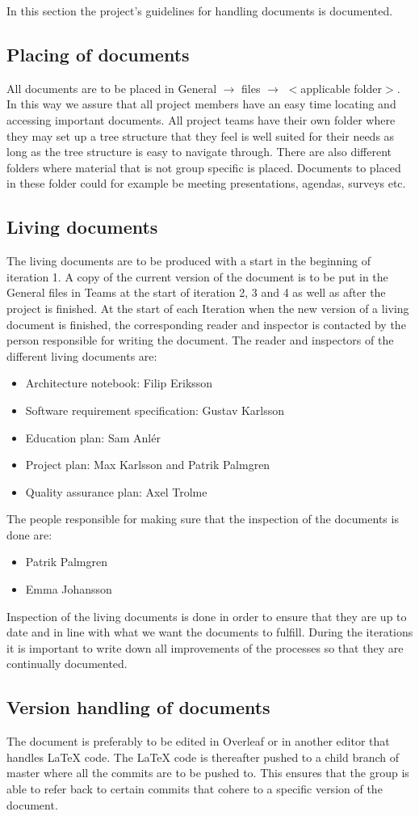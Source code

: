 In this section the project's guidelines for handling documents is documented. 

\subsection{Placing of documents} 
All documents are to be placed in General $\rightarrow$ files $\rightarrow$  \(<\)applicable folder\(>\). In this way we assure that all project members have an easy time locating and accessing important documents. All project teams have their own folder where they may set up a tree structure that they feel is well suited for their needs as long as the tree structure is easy to navigate through. There are also different folders where material that is not group specific is placed. Documents to placed in these folder could for example be meeting presentations, agendas, surveys etc. 

\subsection{Living documents} 
The living documents are to be produced with a start in the beginning of iteration 1. A copy of the current version of the document is to be put in the General files in Teams at the start of iteration 2, 3 and 4 as well as after the project is finished. At the start of each Iteration when the new version of a living document is finished, the corresponding reader and inspector is contacted by the person responsible for writing the document. The reader and inspectors of the different living documents are: 
\begin{itemize}
    \item Architecture notebook: Filip Eriksson
    \item Software requirement specification: Gustav Karlsson
    \item Education plan: Sam Anlér
    \item Project plan: Max Karlsson and Patrik Palmgren
    \item Quality assurance plan: Axel Trolme 
\end{itemize}
The people responsible for making sure that the inspection of the documents is done are: 
\begin{itemize}
    \item Patrik Palmgren
    \item Emma Johansson
\end{itemize}
Inspection of the living documents is done in order to ensure that they are up to date and in line with what we want the documents to fulfill. During the iterations it is important to write down all improvements of the processes so that they are continually documented.

\subsection{Version handling of documents} 
The document is preferably to be edited in Overleaf or in another editor that handles LaTeX code. The LaTeX code is thereafter pushed to a child branch of master where all the commits are to be pushed to. This ensures that the group is able to refer back to certain commits that cohere to a specific version of the document. 